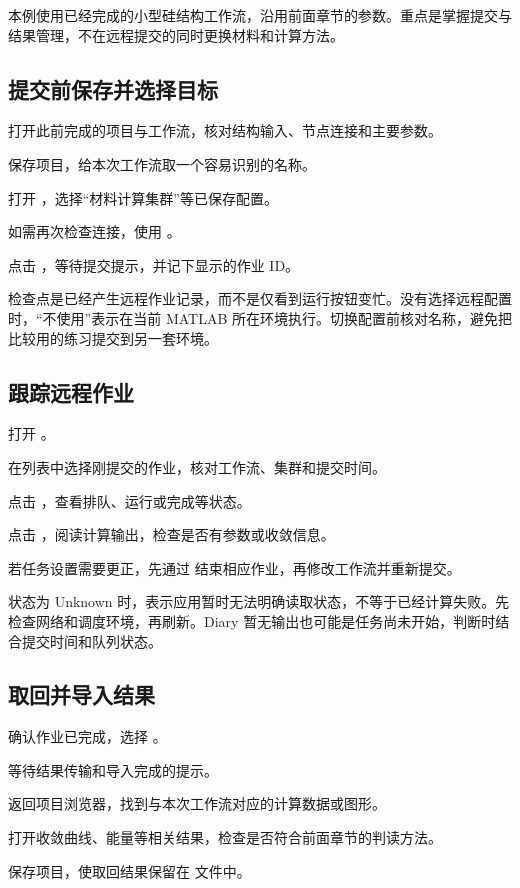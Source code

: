 本例使用已经完成的小型硅结构工作流，沿用前面章节的参数。重点是掌握提交与结果管理，不在远程提交的同时更换材料和计算方法。

\subsection{提交前保存并选择目标}

\begin{steps}
\item 打开此前完成的项目与工作流，核对结构输入、节点连接和主要参数。
\item 保存项目，给本次工作流取一个容易识别的名称。
\item 打开 ，选择“材料计算集群”等已保存配置。
\item 如需再次检查连接，使用 。
\item 点击 ，等待提交提示，并记下显示的作业 ID。
\end{steps}

检查点是已经产生远程作业记录，而不是仅看到运行按钮变忙。没有选择远程配置时，“不使用”表示在当前 MATLAB\regmark{} 所在环境执行。切换配置前核对名称，避免把比较用的练习提交到另一套环境。

\subsection{跟踪远程作业}

\begin{steps}
\item 打开 。
\item 在列表中选择刚提交的作业，核对工作流、集群和提交时间。
\item 点击 ，查看排队、运行或完成等状态。
\item 点击 ，阅读计算输出，检查是否有参数或收敛信息。
\item 若任务设置需要更正，先通过  结束相应作业，再修改工作流并重新提交。
\end{steps}

状态为 Unknown 时，表示应用暂时无法明确读取状态，不等于已经计算失败。先检查网络和调度环境，再刷新。Diary 暂无输出也可能是任务尚未开始，判断时结合提交时间和队列状态。


\subsection{取回并导入结果}

\begin{steps}
\item 确认作业已完成，选择 。
\item 等待结果传输和导入完成的提示。
\item 返回项目浏览器，找到与本次工作流对应的计算数据或图形。
\item 打开收敛曲线、能量等相关结果，检查是否符合前面章节的判读方法。
\item 保存项目，使取回结果保留在  文件中。
\end{steps}

